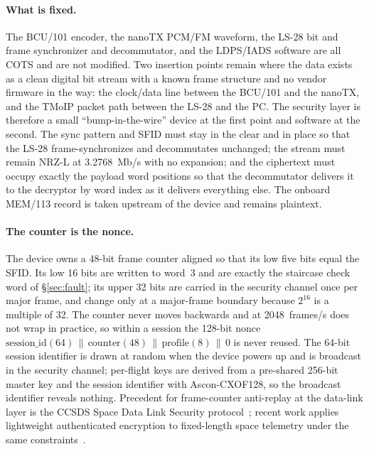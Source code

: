 \documentclass[12pt,letterpaper]{article}
\begin{document}
\paragraph{What is fixed.}
The BCU/101 encoder, the nanoTX PCM/FM waveform, the LS-28 bit and frame synchronizer and
decommutator, and the LDPS/IADS software are all COTS and are not modified. Two insertion
points remain where the data exists as a clean digital bit stream with a known frame
structure and no vendor firmware in the way: the clock/data line between the BCU/101 and
the nanoTX, and the TMoIP packet path between the LS-28 and the PC. The security layer is
therefore a small ``bump-in-the-wire'' device at the first point and software at the
second. The sync pattern and SFID must stay in the clear and in place so that the LS-28
frame-synchronizes and decommutates unchanged; the stream must remain NRZ-L at 3.2768~Mb/s
with no expansion; and the ciphertext must occupy exactly the payload word positions so that
the decommutator delivers it to the decryptor by word index as it delivers everything else.
The onboard MEM/113 record is taken upstream of the device and remains plaintext.

\paragraph{The counter is the nonce.}
The device owns a 48-bit frame counter aligned so that its low five bits equal the SFID. Its
low 16 bits are written to word~3 and are exactly the staircase check word of
\S\ref{sec:fault}; its upper 32 bits are carried in the security channel once per major
frame, and change only at a major-frame boundary because $2^{16}$ is a multiple of 32. The
counter never moves backwards and at 2048~frames/s does not wrap in practice, so within a
session the 128-bit nonce $\text{session\_id}(64) \,\|\, \text{counter}(48) \,\|\,
\text{profile}(8) \,\|\, 0$ is never reused. The 64-bit session identifier is drawn at
random when the device powers up and is broadcast in the security channel; per-flight
keys are derived from a pre-shared 256-bit master key and the session identifier with
Ascon-CXOF128, so the broadcast identifier reveals nothing. Precedent for frame-counter
anti-replay at the data-link layer is the CCSDS Space Data Link Security
protocol~\cite{ccsds355}; recent work applies lightweight authenticated encryption to
fixed-length space telemetry under the same constraints~\cite{savchenko2025}.
\end{document}
